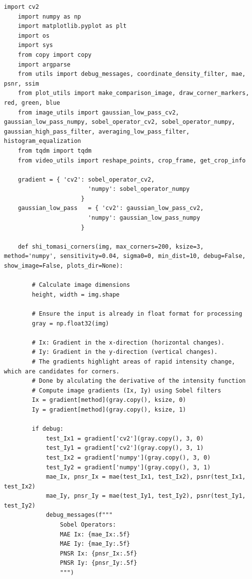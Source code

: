 \documentclass[11pt, conference, letterpaper]{IEEEtran}
\begin{document}
\begin{lstlisting}[style=python, caption={\texttt{shi\_tomasi\_corners.py}}, label={lst:stc}]
    import cv2
    import numpy as np
    import matplotlib.pyplot as plt
    import os
    import sys
    from copy import copy
    import argparse
    from utils import debug_messages, coordinate_density_filter, mae, psnr, ssim
    from plot_utils import make_comparison_image, draw_corner_markers, red, green, blue
    from image_utils import gaussian_low_pass_cv2, gaussian_low_pass_numpy, sobel_operator_cv2, sobel_operator_numpy, gaussian_high_pass_filter, averaging_low_pass_filter, histogram_equalization
    from tqdm import tqdm
    from video_utils import reshape_points, crop_frame, get_crop_info
    
    gradient = { 'cv2': sobel_operator_cv2,
                        'numpy': sobel_operator_numpy
                      }
    gaussian_low_pass   = { 'cv2': gaussian_low_pass_cv2,
                        'numpy': gaussian_low_pass_numpy
                      }
    
    def shi_tomasi_corners(img, max_corners=200, ksize=3, method='numpy', sensitivity=0.04, sigma0=0, min_dist=10, debug=False, show_image=False, plots_dir=None):
        
        # Calculate image dimensions
        height, width = img.shape
        
        # Ensure the input is already in float format for processing
        gray = np.float32(img)
            
        # Ix: Gradient in the x-direction (horizontal changes).
        # Iy: Gradient in the y-direction (vertical changes).
        # The gradients highlight areas of rapid intensity change, which are candidates for corners.
        # Done by alculating the derivative of the intensity function
        # Compute image gradients (Ix, Iy) using Sobel filters
        Ix = gradient[method](gray.copy(), ksize, 0)
        Iy = gradient[method](gray.copy(), ksize, 1)
        
        if debug:
            test_Ix1 = gradient['cv2'](gray.copy(), 3, 0)
            test_Iy1 = gradient['cv2'](gray.copy(), 3, 1)
            test_Ix2 = gradient['numpy'](gray.copy(), 3, 0)
            test_Iy2 = gradient['numpy'](gray.copy(), 3, 1)
            mae_Ix, pnsr_Ix = mae(test_Ix1, test_Ix2), psnr(test_Ix1, test_Ix2)
            mae_Iy, pnsr_Iy = mae(test_Iy1, test_Iy2), psnr(test_Iy1, test_Iy2)
            debug_messages(f"""
                Sobel Operators:
                MAE Ix: {mae_Ix:.5f}
                MAE Iy: {mae_Iy:.5f}
                PNSR Ix: {pnsr_Ix:.5f}
                PNSR Iy: {pnsr_Iy:.5f}
                """)
            

\end{lstlisting}
\end{document}

